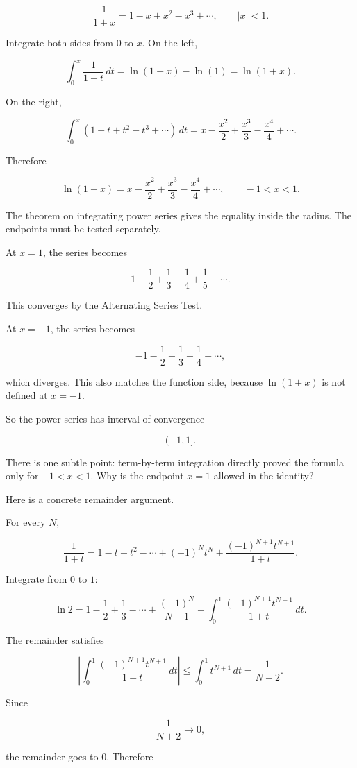 \[
\frac1{1+x}
=
1-x+x^2-x^3+\cdots,
\qquad |x|<1.
\]

Integrate both sides from \(0\) to \(x\).  On the left,

\[
\int_0^x \frac1{1+t}\,dt
=
\ln(1+x)-\ln(1)
=
\ln(1+x).
\]

On the right,

\[
\int_0^x (1-t+t^2-t^3+\cdots)\,dt
=
x-\frac{x^2}{2}+\frac{x^3}{3}-\frac{x^4}{4}+\cdots.
\]

Therefore

\[
\boxed{
\ln(1+x)
=
x-\frac{x^2}{2}+\frac{x^3}{3}-\frac{x^4}{4}+\cdots,
\qquad -1<x<1.
}
\]

The theorem on integrating power series gives the equality inside the radius.  The
endpoints must be tested separately.

At \(x=1\), the series becomes

\[
1-\frac12+\frac13-\frac14+\frac15-\cdots.
\]

This converges by the Alternating Series Test.

At \(x=-1\), the series becomes

\[
-1-\frac12-\frac13-\frac14-\cdots,
\]

which diverges.  This also matches the function side, because \(\ln(1+x)\) is not
defined at \(x=-1\).

So the power series has interval of convergence

\[
\boxed{(-1,1].}
\]

There is one subtle point: term-by-term integration directly proved the formula only
for \(-1<x<1\).  Why is the endpoint \(x=1\) allowed in the identity?

Here is a concrete remainder argument.

For every \(N\),

\[
\frac1{1+t}
=
1-t+t^2-\cdots+(-1)^N t^N
+
\frac{(-1)^{N+1}t^{N+1}}{1+t}.
\]

Integrate from \(0\) to \(1\):

\[
\ln 2
=
1-\frac12+\frac13-\cdots+\frac{(-1)^N}{N+1}
+
\int_0^1 \frac{(-1)^{N+1}t^{N+1}}{1+t}\,dt.
\]

The remainder satisfies

\[
\left|
\int_0^1 \frac{(-1)^{N+1}t^{N+1}}{1+t}\,dt
\right|
\le
\int_0^1 t^{N+1}\,dt
=
\frac1{N+2}.
\]

Since

\[
\frac1{N+2}\to0,
\]

the remainder goes to \(0\).  Therefore

